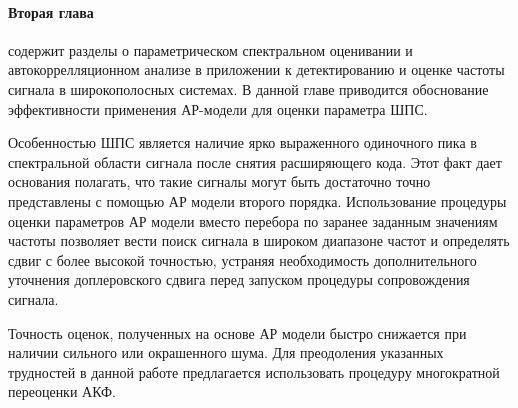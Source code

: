 \paragraph{Вторая глава} содержит разделы о параметрическом спектральном оценивании и автокоррелляционном анализе в приложении к детектированию и оценке
частоты сигнала в широкополосных системах. В данной главе приводится обоснование эффективности применения АР-модели для оценки параметра ШПС.

Особенностью ШПС является наличие ярко выраженного одиночного пика в спектральной области сигнала после снятия расширяющего кода. 
Этот факт дает основания полагать, что такие сигналы могут быть достаточно точно представлены с помощью АР модели второго порядка.
Использование процедуры оценки параметров АР модели вместо перебора по заранее заданным значениям частоты позволяет вести поиск сигнала
в широком диапазоне частот и определять сдвиг с более высокой точностью, устраняя необходимость дополнительного уточнения
доплеровского сдвига перед запуском процедуры сопровождения сигнала.

Точность оценок, полученных на основе АР модели быстро снижается при наличии сильного или окрашенного шума. Для преодоления указанных
трудностей в данной работе предлагается использовать процедуру многократной переоценки АКФ. 
